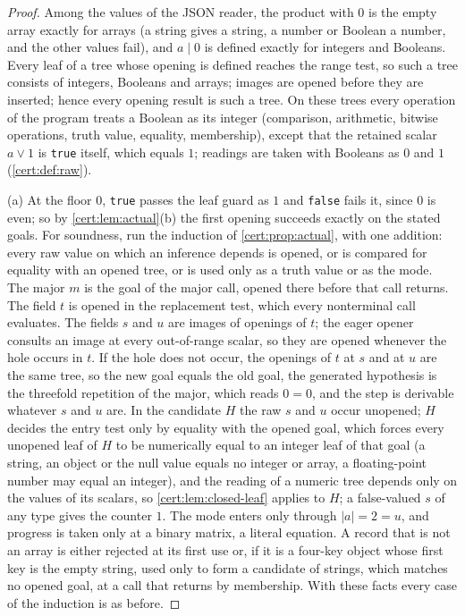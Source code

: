 \begin{proof}
Among the values of the JSON reader, the product with $0$ is the empty array exactly for
arrays (a string gives a string, a number or Boolean a number, and the other values
fail), and $a\mathbin{|}0$ is defined exactly for integers and Booleans. Every leaf of a
tree whose opening is defined reaches the range test, so such a tree consists of integers,
Booleans and arrays; images are opened before they are inserted; hence every opening
result is such a tree. On these trees every operation of the program treats a Boolean
as its integer (comparison, arithmetic, bitwise operations, truth value, equality,
membership), except that the retained scalar $a\lor 1$ is \texttt{true} itself, which
equals $1$; readings are taken with Booleans as $0$ and $1$ (\cref{cert:def:raw}).

(a) At the floor $0$, \texttt{true} passes the leaf guard as $1$ and \texttt{false} fails
it, since $0$ is even; so by \cref{cert:lem:actual}(b) the first opening succeeds exactly on
the stated goals. For soundness, run the induction of \cref{cert:prop:actual}, with one
addition: every raw value on which an inference depends is opened, or is compared for
equality with an opened tree, or is used only as a truth value or as the mode. The major
$m$ is the goal of the major call, opened there before that call returns. The field $t$
is opened in the replacement test, which every nonterminal call evaluates. The fields
$s$ and $u$ are images of openings of $t$; the eager opener consults an image at every
out-of-range scalar, so they are opened whenever the hole occurs in $t$. If the hole does
not occur, the openings of $t$ at $s$ and at $u$ are the same tree, so the new goal equals
the old goal, the generated hypothesis is the threefold repetition of the major, which
reads $0=0$, and the step is derivable whatever $s$ and $u$ are. In the candidate $H$ the
raw $s$ and $u$ occur unopened; $H$ decides the entry test only by equality with the
opened goal, which forces every unopened leaf of $H$ to be numerically equal to an integer
leaf of that goal (a string, an object or the null value equals no integer or array, a
floating-point number may equal an integer), and the reading of a numeric tree depends
only on the values of its scalars, so \cref{cert:lem:closed-leaf} applies to $H$; a
false-valued $s$ of any type gives the counter $1$. The mode enters only through
$\lvert a\rvert=2=u$, and progress is taken only at a binary matrix, a literal
equation. A record that is not an array is either rejected at its first use or, if it
is a four-key object whose first key is the empty string, used only to form a candidate
of strings, which matches no opened goal, at a call that returns by membership. With
these facts every case of the induction is as before.


\end{proof}
